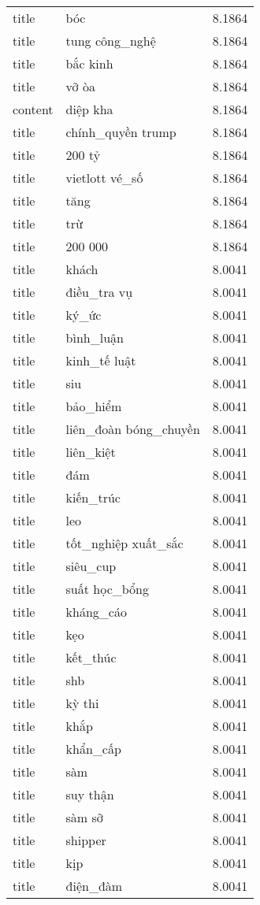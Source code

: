\documentclass{article}
\begin{document}
\begin{tabular}{lll}
title & bóc & 8.1864\\
title & tung công\_nghệ & 8.1864\\
title & bắc kinh & 8.1864\\
title & vỡ òa & 8.1864\\
content & diệp kha & 8.1864\\
title & chính\_quyền trump & 8.1864\\
title & 200 tỷ & 8.1864\\
title & vietlott vé\_số & 8.1864\\
title & tăng & 8.1864\\
title & trừ & 8.1864\\
title & 200 000 & 8.1864\\
title & khách & 8.0041\\
title & điều\_tra vụ & 8.0041\\
title & ký\_ức & 8.0041\\
title & bình\_luận & 8.0041\\
title & kinh\_tế luật & 8.0041\\
title & siu & 8.0041\\
title & bảo\_hiểm & 8.0041\\
title & liên\_đoàn bóng\_chuyền & 8.0041\\
title & liên\_kiệt & 8.0041\\
title & đám & 8.0041\\
title & kiến\_trúc & 8.0041\\
title & leo & 8.0041\\
title & tốt\_nghiệp xuất\_sắc & 8.0041\\
title & siêu\_cup & 8.0041\\
title & suất học\_bổng & 8.0041\\
title & kháng\_cáo & 8.0041\\
title & kẹo & 8.0041\\
title & kết\_thúc & 8.0041\\
title & shb & 8.0041\\
title & kỳ thi & 8.0041\\
title & khắp & 8.0041\\
title & khẩn\_cấp & 8.0041\\
title & sàm & 8.0041\\
title & suy thận & 8.0041\\
title & sàm sỡ & 8.0041\\
title & shipper & 8.0041\\
title & kịp & 8.0041\\
title & điện\_đàm & 8.0041\\

\end{tabular}
\end{document}
